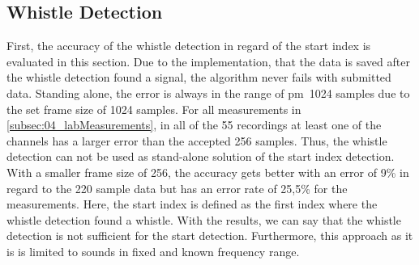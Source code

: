 
\subsection{Whistle Detection}
\label{subsec:04_wd}

First, the accuracy of the whistle detection in regard of the start index
is evaluated in this section.
Due to the implementation, that the data is saved after the whistle detection
found a signal, the algorithm never fails with submitted data.
Standing alone, the error is always in the range of \si{\pm1024} samples due to the
set frame size of 1024 samples.
For all measurements in \cref{subsec:04_labMeasurements}, in all of the 55 recordings
at least one of the channels has a larger error than
the accepted 256 samples.
Thus, the whistle detection can not be used as stand-alone solution of the start index
detection.
With a smaller frame size of 256, the accuracy gets better with an error of
9\si{\percent} in regard to the 220 sample data but has an error rate of
25,5\si{\percent} for the measurements.
Here, the start index is defined as the first index where the whistle detection
found a whistle.
With the results, we can say that the whistle detection is not sufficient
for the start detection.
Furthermore, this approach as it is is limited to sounds in fixed and known frequency range.

